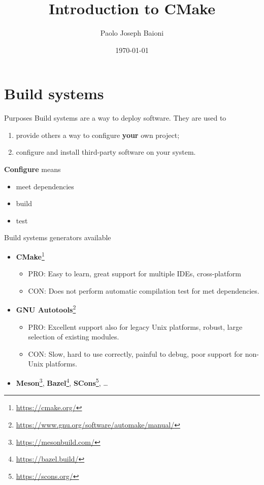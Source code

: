 \documentclass[aspectratio=169,11pt]{beamer}
\title{Introduction to CMake}
\author{Paolo Joseph Baioni}
\institute{Politecnico di Milano}
\date{\today}
\begin{document}
\begin{frame}[plain]{}
    \maketitle
\end{frame}

\section{Build systems}
\begin{frame}{Purposes}
    Build systems are a way to deploy software.
    \vfill
    They are used to
    \begin{enumerate}
        \item provide others a way to configure \textbf{your} own project;
        \item configure and install third-party software on your system.
    \end{enumerate}
    \vfill
    \textbf{Configure} means
    \begin{itemize}
        \item meet dependencies
        \item build
        \item test
    \end{itemize}
\end{frame}

\begin{frame}{Build systems generators available}
    \begin{itemize}
    \item \textbf{CMake}\footnote{\url{https://cmake.org/}}
    \begin{itemize}
    \item PRO: Easy to learn, great support for multiple IDEs, cross-platform
    \item CON: Does not perform automatic compilation test for met dependencies.
    \end{itemize}
    \item \textbf{GNU Autotools}\footnote{\url{https://www.gnu.org/software/automake/manual/}}
    \begin{itemize}
    \item PRO: Excellent support also for legacy Unix platforms, robust, large selection of existing modules.
    \item CON: Slow, hard to use correctly, painful to debug, poor support for non-Unix platforms.
    \end{itemize}
    \item \textbf{Meson}\footnote{\url{https://mesonbuild.com/}}, \textbf{Bazel}\footnote{\url{https://bazel.build/}}, \textbf{SCons}\footnote{\url{https://scons.org/}}, \dots
    \end{itemize}
\end{frame}
\end{document}
